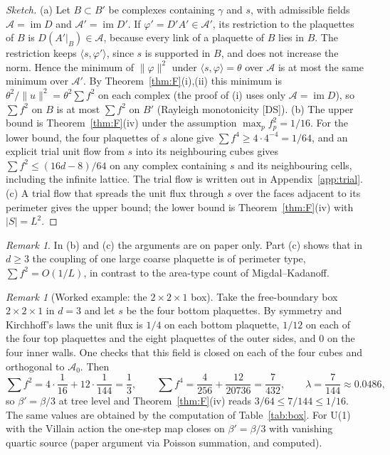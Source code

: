 \documentclass[11pt,a4paper]{article}
\theoremstyle{definition}
\theoremstyle{remark}
\newtheorem{remark}[theorem]{Remark}
\newcommand{\cA}{\mathcal{A}}
\newcommand{\im}{\operatorname{im}}
\begin{document}
\begin{proof}[Sketch]
(a) Let $B\subset B'$ be complexes containing $\gamma$ and $s$, with admissible fields $\cA=\im D$ and $\cA'=\im D'$. If $\varphi'=D'A'\in\cA'$, its restriction to the plaquettes of $B$ is $D(A'|_B)\in\cA$, because every link of a plaquette of $B$ lies in $B$. The restriction keeps $\langle s,\varphi'\rangle$, since $s$ is supported in $B$, and does not increase the norm. Hence the minimum of $\|\varphi\|^2$ under $\langle s,\varphi\rangle=\theta$ over $\cA$ is at most the same minimum over $\cA'$. By Theorem~\ref{thm:F}(i),(ii) this minimum is $\theta^2/\|u\|^2=\theta^2\sum f^2$ on each complex (the proof of (i) uses only $\cA=\im D$), so $\sum f^2$ on $B$ is at most $\sum f^2$ on $B'$ (Rayleigh monotonicity [DS]). (b) The upper bound is Theorem~\ref{thm:F}(iv) under the assumption $\max_pf_p^2=1/16$. For the lower bound, the four plaquettes of $s$ alone give $\sum f^4\ge4\cdot4^{-4}=1/64$, and an explicit trial unit flow from $s$ into its neighbouring cubes gives $\sum f^2\le(16d-8)/64$ on any complex containing $s$ and its neighbouring cells, including the infinite lattice. The trial flow is written out in Appendix~\ref{app:trial}. (c) A trial flow that spreads the unit flux through $s$ over the faces adjacent to its perimeter gives the upper bound; the lower bound is Theorem~\ref{thm:F}(iv) with $|S|=L^2$.
\end{proof}

\begin{remark}
In (b) and (c) the arguments are on paper only. Part (c) shows that in $d\ge3$ the coupling of one large coarse plaquette is of perimeter type, $\sum f^2=O(1/L)$, in contrast to the area-type count of Migdal--Kadanoff.
\end{remark}

\begin{remark}[Worked example: the $2\times2\times1$ box]\label{rem:221}
Take the free-boundary box $2\times2\times1$ in $d=3$ and let $s$ be the four bottom plaquettes. By symmetry and Kirchhoff's laws the unit flux is $1/4$ on each bottom plaquette, $1/12$ on each of the four top plaquettes and the eight plaquettes of the outer sides, and $0$ on the four inner walls. One checks that this field is closed on each of the four cubes and orthogonal to $\cA_0$. Then
\[
\textstyle\sum f^2=4\cdot\frac1{16}+12\cdot\frac1{144}=\frac13,\qquad
\sum f^4=\frac4{256}+\frac{12}{20736}=\frac7{432},\qquad
\lambda=\frac{7}{144}\approx0.0486,
\]
so $\beta'=\beta/3$ at tree level and Theorem~\ref{thm:F}(iv) reads $3/64\le7/144\le1/16$. The same values are obtained by the computation of Table~\ref{tab:box}. For U(1) with the Villain action the one-step map closes on $\beta'=\beta/3$ with vanishing quartic source (paper argument via Poisson summation, and computed).
\end{remark}
\end{document}
